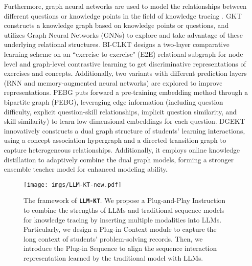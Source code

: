 Furthermore, graph neural networks are used to model the relationships between different questions or knowledge points in the field of knowledge tracing \cite{GKT,Bi-CLKT,PEBG,DGEKT}. 
GKT \cite{GKT} constructs a knowledge graph based on knowledge points or questions, and utilizes Graph Neural Networks (GNNs) to explore and take advantage of these underlying relational structures. 
BI-CLKT \cite{Bi-CLKT} designs a two-layer comparative learning scheme on an ``exercise-to-exercise" (E2E) relational subgraph for node-level and graph-level contrastive learning to get discriminative representations of exercises and concepts. Additionally, two variants with different prediction layers (RNN and memory-augmented neural networks) are explored to improve representations.
PEBG \cite{PEBG} puts forward a pre-training embedding method through a bipartite graph (PEBG), leveraging edge information (including question difficulty, explicit question-skill relationships, implicit question similarity, and skill similarity) to learn low-dimensional embeddings for each question. 
DGEKT \cite{DGEKT} innovatively constructs a dual graph structure of students' learning interactions, using a concept association hypergraph and a directed transition graph to capture heterogeneous relationships. Additionally, it employs online knowledge distillation to adaptively combine the dual graph models, forming a stronger ensemble teacher model for enhanced modeling ability.



\begin{figure*}[!t]
\begin{center}
\texttt{[image: imgs/LLM-KT-new.pdf]}
\end{center}
\caption{The framework of \texttt{\textbf{LLM-KT}}. We propose a Plug-and-Play Instruction to combine the strengths of LLMs and traditional sequence models for knowledge tracing by inserting multiple modalities into LLMs. Particularly, we design a Plug-in Context module to capture the long context of students' problem-solving records. Then, we introduce the Plug-in Sequence to align the sequence interaction representation learned by the traditional model with LLMs.} 
\label{fig:main}
\end{figure*}



